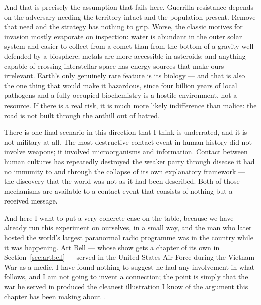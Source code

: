 And that is precisely the assumption that fails here. Guerrilla resistance depends on the adversary
needing the territory intact and the population present. Remove that need and the strategy has
nothing to grip. Worse, the classic motives for invasion mostly evaporate on inspection: water is
abundant in the outer solar system and easier to collect from a comet than from the bottom of a
gravity well defended by a biosphere; metals are more accessible in asteroids; and anything capable
of crossing interstellar space has energy sources that make ours irrelevant. Earth's only genuinely
rare feature is its biology --- and that is also the one thing that would make it hazardous, since
four billion years of local pathogens and a fully occupied biochemistry is a hostile environment,
not a resource. If there is a real risk, it is much more likely indifference than malice: the road
is not built through the anthill out of hatred.


There is one final scenario in this direction that I think is underrated, and it is not military at
all. The most destructive contact event in human history did not involve weapons; it involved
microorganisms and information. Contact between human cultures has repeatedly destroyed the weaker
party through disease it had no immunity to and through the collapse of its own explanatory framework
--- the discovery that the world was not as it had been described. Both of those mechanisms are
available to a contact event that consists of nothing but a received message.

And here I want to put a very concrete case on the table, because we have already run this
experiment on ourselves, in a small way, and the man who later hosted the world's largest
paranormal radio programme was in the country while it was happening. Art Bell --- whose show gets a
chapter of its own in Section~\ref{sec:artbell} --- served in the United States Air Force during the
Vietnam War as a medic. I have found nothing to suggest he had any involvement in what follows, and I
am not going to invent a connection; the point is simply that the war he served in produced the
cleanest illustration I know of the argument this chapter has been making about .

